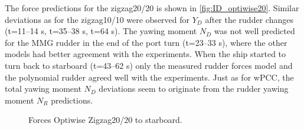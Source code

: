 The force predictions for the zigzag20/20 is shown in \autoref{fig:ID_optiwise20}. Similar deviations as for the zigzag10/10 were observed for $Y_D$ after the rudder changes (t=11--14 s, t=35--38 s, t=64 s). The yawing moment $N_D$ was not well predicted for the MMG rudder in the end of the port turn (t=23--33 s), where the other models had better agreement with the experiments. When the ship started to turn back to starboard (t=43--62 s) only the measured rudder forces model and the polynomial rudder agreed well with the experiments. Just as for wPCC, the total yawing moment $N_D$ deviations seem to originate from the rudder yawing moment $N_R$ predictions.
\begin{figure}[h]
    
    \caption{Forces Optiwise Zigzag20/20 to starboard.}
    \label{fig:ID_optiwise20}
\end{figure}
%         
%         

